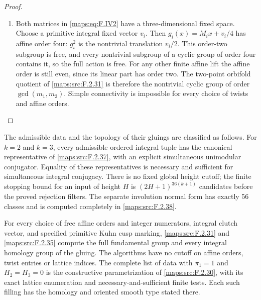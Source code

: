 \begin{proof}
\begin{enumerate}[label={$\langle1\rangle$\arabic*.}]
\item Both matrices in \eqref{maps:eq:F.IV2} have a three-dimensional fixed
space.  Choose a primitive integral fixed vector $v_i$.
Then $g_i(x)=M_ix+v_i/4$ has affine order four:
$g_i^2$ is the nontrivial translation $v_i/2$.
This order-two subgroup is free, and every nontrivial
subgroup of a cyclic group of order four contains it, so
the full action is free.  For any other finite affine lift
the affine order is still even, since its linear part has
order two.  The two-point orbifold quotient of \ref{maps:src:F.2.31} is
therefore the nontrivial cyclic group of order
$\gcd(m_1,m_2)$.  Simple connectivity is impossible for
every choice of twists and affine orders.

\end{enumerate}
\end{proof}




\begin{theorem}\hypertarget{tag-02NU}{}\label{maps:src:F.2.39}


The admissible data and the topology of their gluings are classified as follows.
For $k=2$ and $k=3$, every admissible ordered integral tuple
has the canonical representative of \ref{maps:src:F.2.37}, with an explicit
simultaneous unimodular conjugator.  Equality of these
representatives is necessary and sufficient for simultaneous
integral conjugacy.  There is no fixed global height cutoff;
the finite stopping bound for an input of height $H$ is
$(2H+1)^{36(k+1)}$ candidates before the proved rejection
filters.  The separate involution normal form has exactly
56 classes and is computed completely in \ref{maps:src:F.2.38}.

For every choice of free affine orders and integer
numerators, integral clutch vector, and specified primitive
Kuhn cusp marking, \ref{maps:src:F.2.31} and \ref{maps:src:F.2.35} compute the full
fundamental group and every integral homology group of the
gluing.  The algorithms have no cutoff on affine orders,
twist entries or lattice indices.  The complete list of data
with $\pi_1=1$ and $H_2=H_3=0$ is the constructive
parametrization of \ref{maps:src:F.2.30}, with its exact lattice enumeration
and necessary-and-sufficient finite tests.  Each such filling has the homology and oriented smooth type stated
there.

\end{theorem}


